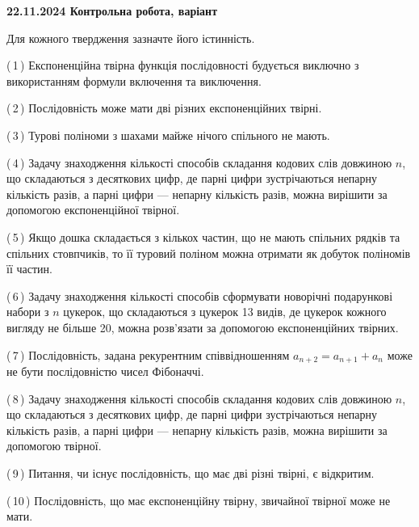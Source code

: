 \documentclass[12pt, ukrainian]{article}
\begin{document}
\begin {large}
\begin {large}
\begin {large}
\begin {large}
\begin {large}
\begin {large}
\begin {large}
\begin {large}
\begin {large}
\begin {large}
\begin {large}
\textbf{22.11.2024 Контрольна робота, варіант  }\par


{
Для кожного твердження зазначте його істинність.\par

\vspace{2mm}

(\,1\,) Експоненційна твірна функція послідовності будується виключно з використанням формули включення та виключення.%



(\,2\,) Послідовність може мати дві різних експоненційних твірні.%



(\,3\,) Турові поліноми з шахами майже нічого спільного не мають.%



(\,4\,) Задачу знаходження кількості способів складання кодових слів довжиною $n$, що складаються з десяткових цифр, де парні цифри зустрічаються непарну кількість разів, а парні цифри — непарну кількість разів, можна вирішити за допомогою експоненційної твірної.%



(\,5\,) Якщо дошка складається з кількох частин, що не мають спільних рядків та спільних стовпчиків, то її туровий поліном можна отримати як добуток поліномів її частин.%



(\,6\,) Задачу знаходження кількості способів сформувати новорічні подарункові набори з $n$ цукерок, що складаються з цукерок 13 видів, де цукерок кожного вигляду не більше 20, можна розв’язати за допомогою експоненційних твірних.%



(\,7\,) Послідовність, задана рекурентним співвідношенням $a_{n+2}=a_{n+1}+a_{n}$ може не бути послідовністю чисел Фібоначчі.%



(\,8\,) Задачу знаходження кількості способів складання кодових слів довжиною $n$, що складаються з десяткових цифр, де парні цифри зустрічаються непарну кількість разів, а парні цифри — непарну кількість разів, можна вирішити за допомогою твірної.%



(\,9\,) Питання, чи існує послідовність, що має дві різні твірні, є відкритим.%



(\,10\,) Послідовність, що має експоненційну твірну, звичайної твірної може не мати.%




}
\end{large}
\end{large}
\end{large}
\end{large}
\end{large}
\end{large}
\end{large}
\end{large}
\end{large}
\end{large}
\end{large}
\end{document}
